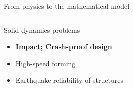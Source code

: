 \begin{frame}{From physics to the mathematical model}
  \vspace{-0.6cm}
  \begin{overprint}
    \begin{columns}
      \begin{column}{0.45\textwidth}
        \begin{block}{Solid dynamics problems}
          \begin{itemize}
          \item[] \textbf{Impact; Crash-proof design}
          \item[] High-speed forming
          \item[] Earthquake reliability of structures 
          \end{itemize}
        \end{block}
      \end{column}
      
      \begin{column}{0.55\textwidth}
      \end{column}
    \end{columns}
    
    \begin{figure}[ht]
      \centering
    \end{figure}
    

\end{overprint}
\end{frame}
